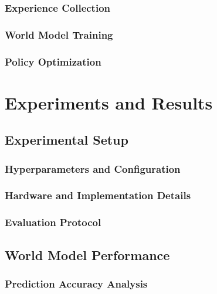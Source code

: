 \documentclass[
	english,
	ruledheaders=section,
	class=report,
	thesis={type=master},
	accentcolor=9c,
	custommargins=true,
	marginpar=false,
	parskip=half-,
	fontsize=11pt,
]{tudapub}
\begin{document}
\subsection{Experience Collection}
\label{subsec:experience_collection}

\subsection{World Model Training}
\label{subsec:world_model_training}

\subsection{Policy Optimization}
\label{subsec:policy_optimization}

\chapter{Experiments and Results}
\label{chap:experiments}

\section{Experimental Setup}
\label{sec:exp_setup}

\subsection{Hyperparameters and Configuration}
\label{subsec:hyperparameters}

\subsection{Hardware and Implementation Details}
\label{subsec:hardware}

\subsection{Evaluation Protocol}
\label{subsec:eval_protocol}

\section{World Model Performance}
\label{sec:world_model_perf}

\subsection{Prediction Accuracy Analysis}
\label{subsec:prediction_accuracy}
\end{document}
